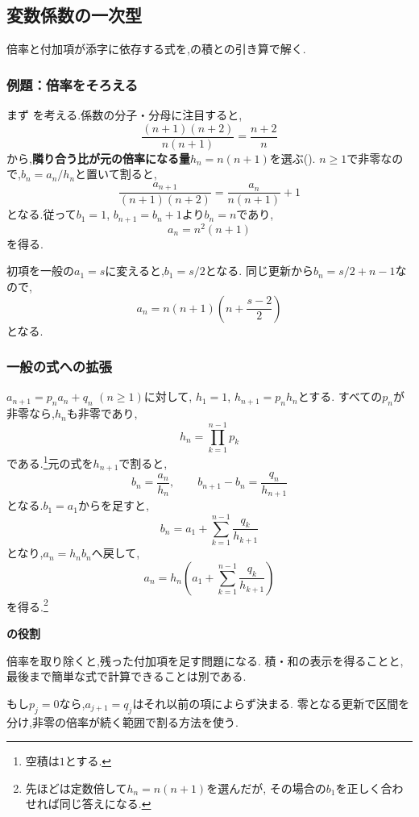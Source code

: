 \subsection{変数係数の一次型}\label{節：変数係数の一次漸化式}
  倍率と付加項が添字に依存する式を,の積との引き算で解く.

  \subsubsection{例題：倍率をそろえる}
  まず
  \BookMathLayout{\[
    a_1=2,\qquad
    a_{n+1}=\frac{n+2}{n}a_n+(n+1)(n+2)
    \quad(n\ge1)
  \]}{\[
    \begin{aligned}
      a_1&=2,\\
      a_{n+1}&=\frac{n+2}{n}a_n+(n+1)(n+2)\\
      &\quad(n\ge1)
    \end{aligned}
  \]}
  を考える.係数の分子・分母に注目すると,
  \[
    \frac{(n+1)(n+2)}{n(n+1)}=\frac{n+2}{n}
  \]
  から,\textbf{隣り合う比が元の倍率になる量}$h_n=n(n+1)$を選ぶ().
  $n\ge1$で非零なので,$b_n=a_n/h_n$と置いて割ると,
  \[
    \frac{a_{n+1}}{(n+1)(n+2)}
      =\frac{a_n}{n(n+1)}+1
  \]
  となる.従って$b_1=1$, $b_{n+1}=b_n+1$より$b_n=n$であり,
  \[
    a_n=n^2(n+1)
  \]
  を得る.

  初項を一般の$a_1=s$に変えると,$b_1=s/2$となる.
  同じ更新から$b_n=s/2+n-1$なので,
  \[
    a_n=n(n+1)\left(n+\frac{s-2}{2}\right)
  \]
  となる.

  \subsubsection{一般の式への拡張}
  $a_{n+1}=p_na_n+q_n$ $(n\ge1)$に対して,
  $h_1=1$, $h_{n+1}=p_nh_n$とする.
  すべての$p_n$が非零なら,$h_n$も非零であり,
  \[
    h_n=\prod_{k=1}^{n-1}p_k
  \]
  である.\footnote{空積は$1$とする.}元の式を$h_{n+1}$で割ると,
  \[
    b_n=\frac{a_n}{h_n},\qquad
    b_{n+1}-b_n=\frac{q_n}{h_{n+1}}
  \]
  となる.$b_1=a_1$からを足すと,
  \[
    b_n=a_1+\sum_{k=1}^{n-1}\frac{q_k}{h_{k+1}}
  \]
  となり,$a_n=h_nb_n$へ戻して,
  \[
    a_n=h_n\left(a_1+\sum_{k=1}^{n-1}\frac{q_k}{h_{k+1}}\right)
  \]
  を得る.\footnote{先ほどは定数倍して$h_n=n(n+1)$を選んだが,
  その場合の$b_1$を正しく合わせれば同じ答えになる.}
  \begin{bookpoint}
    \textbf{の役割}\par
    倍率を取り除くと,残った付加項を足す問題になる.
    積・和の表示を得ることと,最後まで簡単な式で計算できることは別である.
  \end{bookpoint}
  もし$p_j=0$なら,$a_{j+1}=q_j$はそれ以前の項によらず決まる.
  零となる更新で区間を分け,非零の倍率が続く範囲で割る方法を使う.

